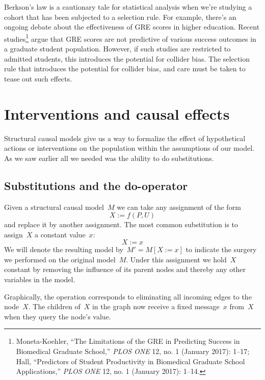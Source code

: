 \documentclass{tufte-book}
\begin{document}
Berkson's law is a cautionary tale for statistical analysis when we're
studying a cohort that has been subjected to a selection rule. For
example, there's an ongoing debate about the effectiveness of GRE scores
in higher education. Recent studies\footnote{Moneta-Koehler, {``The
  Limitations of the GRE in Predicting Success in Biomedical Graduate
  School,''} \emph{PLOS ONE} 12, no. 1 (January 2017): 1--17; Hall,
  {``Predictors of Student Productivity in Biomedical Graduate School
  Applications,''} \emph{PLOS ONE} 12, no. 1 (January 2017): 1--14.}
argue that GRE scores are not predictive of various success outcomes in
a graduate student population. However, if such studies are restricted
to admitted students, this introduces the potential for collider bias.
The selection rule that introduces the potential for collider bias, and
care must be taken to tease out such effects.

\hypertarget{interventions-and-causal-effects}{%
\section{Interventions and causal
effects}\label{interventions-and-causal-effects}}

Structural causal models give us a way to formalize the effect of
hypothetical actions or interventions on the population within the
assumptions of our model. As we saw earlier all we needed was the
ability to do substitutions.

\hypertarget{substitutions-and-the-do-operator}{%
\subsection{Substitutions and the
do-operator}\label{substitutions-and-the-do-operator}}

Given a structural causal model~\(M\) we can take any assignment of the
form \[
X := f(P, U)
\] and replace it by another assignment. The most common substitution is
to assign~\(X\) a constant value~\(x\): \[
X := x
\] We will denote the resulting model by~\(M'=M[X:=x]\) to indicate the
surgery we performed on the original model~\(M\). Under this assignment
we hold~\(X\) constant by removing the influence of its parent nodes and
thereby any other variables in the model.

Graphically, the operation corresponds to eliminating all incoming edges
to the node~\(X\). The children of~\(X\) in the graph now receive a
fixed message~\(x\) from~\(X\) when they query the node's value.
\end{document}
